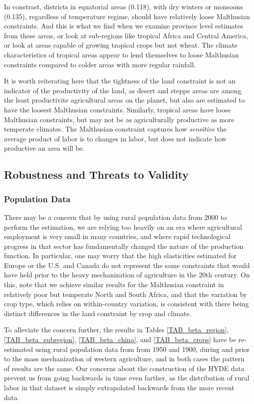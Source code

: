 \documentclass[11pt]{article}
\begin{document}
In constrast, districts in equatorial areas (0.118), with dry winters or monsoons (0.135), regardless of temperature regime, should have relatively loose Malthusian constraints. And this is what we find when we examine province level estimates from these areas, or look at sub-regions like tropical Africa and Central America, or look at areas capable of growing tropical crops but not wheat. The climate characteristics of tropical areas appear to lend themselves to loose Malthusian constraints compared to colder areas with more regular rainfall. 

It is worth reiterating here that the tightness of the land constraint is not an indicator of the productivity of the land, as desert and steppe areas are among the least productivite agricultural areas on the planet, but also are estimated to have the loosest Malthusian constraints. Similarly, tropical areas have loose Malthusian constraints, but may not be as agriculturally productive as more temperate climates. The Malthusian constraint captures how \textit{sensitive} the average product of labor is to changes in labor, but does not indicate how productive an area will be.

\subsection{Robustness and Threats to Validity}
\subsubsection{Population Data} 
There may be a concern that by using rural population data from 2000 to perform the estimation, we are relying too heavily on an era where agricultural employment is very small in many countries, and where rapid technological progress in that sector has fundamentally changed the nature of the production function. In particular, one may worry that the high elasticities estimated for Europe or the U.S. and Canada do not represent the same constraints that would have held prior to the heavy mechanization of agriculture in the 20th century. On this, note that we achieve similar results for the Malthusian constraint in relatively poor but temperate North and South Africa, and that the variation by crop type, which relies on within-country variation, is consistent with there being distinct differences in the land constraint by crop and climate. 

To alleviate the concern further, the results in Tables \ref{TAB_beta_region}, \ref{TAB_beta_subregion}, \ref{TAB_beta_china}, and \ref{TAB_beta_crops} have be re-estimated using rural population data from \citet{hyde31} from 1950 and 1900, during and prior to the mass mechanization of western agriculture, and in both cases the pattern of results are the same. Our concerns about the construction of the HYDE data prevent us from going backwards in time even farther, as the distribution of rural labor in that dataset is simply extrapolated backwards from the more recent data.
\end{document}
